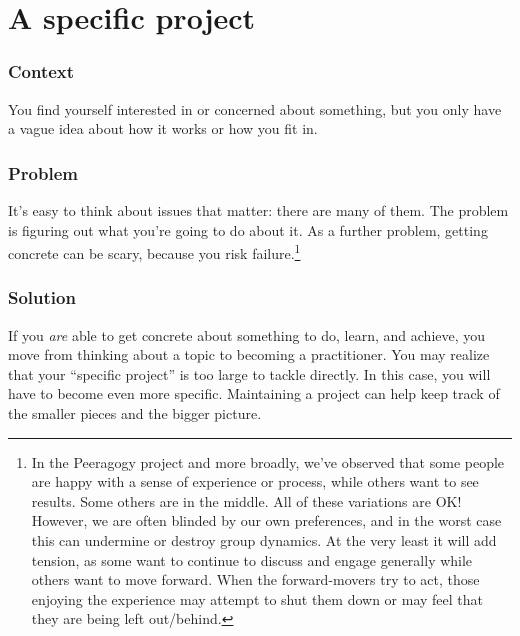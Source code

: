 \section{A specific project}\label{sec:A_specific_project}
\subsubsection*{Context}
You find yourself interested in or concerned about something, but you
only have a vague idea about how it works or how you fit in.

\subsubsection*{Problem}
It's easy to think about issues that matter: there are many of
them. The problem is figuring out what you're going to do about it.
As a further problem, getting concrete can be scary, because you risk
failure.\footnote{In the Peeragogy project and more broadly, we've
  observed that some people are happy with a sense of experience or
  process, while others want to see results. Some others are in the
  middle.  All of these variations are OK!  However, we are often
  blinded by our own preferences, and in the worst case this can
  undermine or destroy group dynamics.  At the very least it will add
  tension, as some want to continue to discuss and engage generally
  while others want to move forward.  When the forward-movers try to
  act, those enjoying the experience may attempt to shut them down or
  may feel that they are being left out/behind.}

\subsubsection*{Solution} 
If you \emph{are} able to get concrete about something to do, learn, and achieve, you move from thinking about a topic to becoming a practitioner.  You may realize that your ``specific project'' is too large to tackle directly. In this case, you will have to become even more specific.  Maintaining a project  can help keep track of the smaller pieces and the bigger picture.

